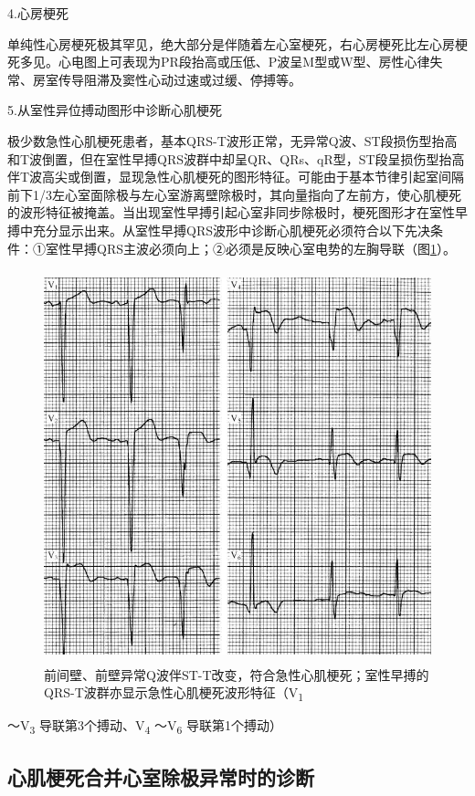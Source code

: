 4.心房梗死

单纯性心房梗死极其罕见，绝大部分是伴随着左心室梗死，右心房梗死比左心房梗死多见。心电图上可表现为PR段抬高或压低、P波呈M型或W型、房性心律失常、房室传导阻滞及窦性心动过速或过缓、停搏等。

5.从室性异位搏动图形中诊断心肌梗死

极少数急性心肌梗死患者，基本QRS-T波形正常，无异常Q波、ST段损伤型抬高和T波倒置，但在室性早搏QRS波群中却呈QR、QRs、qR型，ST段呈损伤型抬高伴T波高尖或倒置，显现急性心肌梗死的图形特征。可能由于基本节律引起室间隔前下1/3左心室面除极与左心室游离壁除极时，其向量指向了左前方，使心肌梗死的波形特征被掩盖。当出现室性早搏引起心室非同步除极时，梗死图形才在室性早搏中充分显示出来。从室性早搏QRS波形中诊断心肌梗死必须符合以下先决条件：①室性早搏QRS主波必须向上；②必须是反映心室电势的左胸导联（图\ref{fig44-14}）。

\begin{figure}[!htbp]
 \centering
 \includegraphics[width=4.58333in,height=4.46875in]{./images/Image00722.jpg}
 \captionsetup{justification=centering}
 \caption{前间壁、前壁异常Q波伴ST-T改变，符合急性心肌梗死；室性早搏的QRS-T波群亦显示急性心肌梗死波形特征（V\textsubscript{1}}
 \label{fig44-14}
  \end{figure} 
～V\textsubscript{3} 导联第3个搏动、V\textsubscript{4}
～V\textsubscript{6} 导联第1个搏动）

\protect\hypertarget{text00052.htmlux5cux23subid629}{}{}

\subsection{心肌梗死合并心室除极异常时的诊断}

